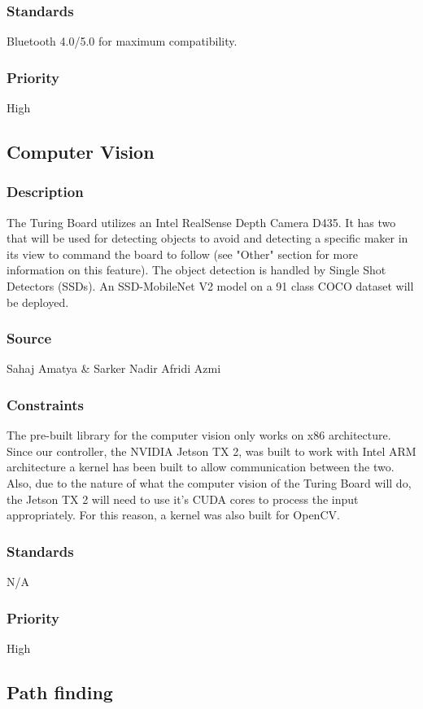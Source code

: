 \subsubsection{Standards}
Bluetooth 4.0/5.0 for maximum compatibility.
\subsubsection{Priority}
High

\subsection{Computer Vision}
\subsubsection{Description}
The Turing Board utilizes an Intel RealSense Depth Camera D435. It has two that will be used for detecting objects to avoid and detecting a specific maker in its view to command the board to follow (see "Other" section for more information on this feature). The object detection is handled by Single Shot Detectors (SSDs). An SSD-MobileNet V2 model on a 91 class COCO dataset will be deployed.
\subsubsection{Source}
Sahaj Amatya & Sarker Nadir Afridi Azmi
\subsubsection{Constraints}
The pre-built library for the computer vision only works on x86 architecture. Since our controller, the NVIDIA Jetson TX 2, was built to work with Intel ARM architecture a kernel has been built to allow communication between the two.
Also, due to the nature of what the computer vision of the Turing Board will do, the Jetson TX 2 will need to use it's CUDA cores to process the input appropriately. For this reason, a kernel was also built for OpenCV.
\subsubsection{Standards}
N/A
\subsubsection{Priority}
High

\subsection{Path finding}
